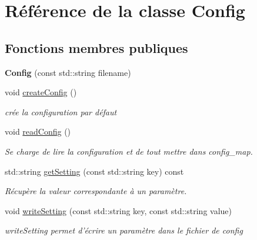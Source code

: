 \hypertarget{class_config}{\section{Référence de la classe Config}
\label{class_config}
}
\subsection*{Fonctions membres publiques}
\begin{DoxyCompactItemize}
\item 
\hypertarget{class_config_aad65625e287f74e7618e54af59bce58f}{{\bfseries Config} (const std\+::string filename)}\label{class_config_aad65625e287f74e7618e54af59bce58f}

\item 
\hypertarget{class_config_a18410803ad858b99fcbd80b30d3dd1bd}{void \hyperlink{class_config_a18410803ad858b99fcbd80b30d3dd1bd}{create\+Config} ()}\label{class_config_a18410803ad858b99fcbd80b30d3dd1bd}

\begin{DoxyCompactList}\small\item\em crée la configuration par défaut \end{DoxyCompactList}\item 
\hypertarget{class_config_a10cc202278ee46b337939bee812b660f}{void \hyperlink{class_config_a10cc202278ee46b337939bee812b660f}{read\+Config} ()}\label{class_config_a10cc202278ee46b337939bee812b660f}

\begin{DoxyCompactList}\small\item\em Se charge de lire la configuration et de tout mettre dans config\+\_\+map. \end{DoxyCompactList}\item 
std\+::string \hyperlink{class_config_ac7a5f71f677d53e4e80c81c12bb509bf}{get\+Setting} (const std\+::string key) const 
\begin{DoxyCompactList}\small\item\em Récupère la valeur correspondante à un paramètre. \end{DoxyCompactList}\item 
void \hyperlink{class_config_a0ac85d65a0bd9d91cac5b37bceaba3ac}{write\+Setting} (const std\+::string key, const std\+::string value)
\begin{DoxyCompactList}\small\item\em write\+Setting permet d'écrire un paramètre dans le fichier de config \end{DoxyCompactList}\end{DoxyCompactItemize}


